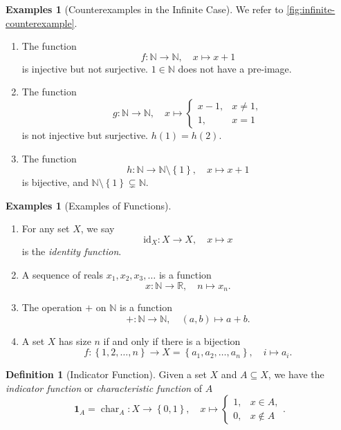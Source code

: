 \documentclass{article}
\theoremstyle{definition}
\newtheorem{definition}[theorem]{Definition}
\newtheorem{examples}[theorem]{Examples}
\theoremstyle{remark}
\newcommand{\pqty}[1]{\left(#1\right)}
\newcommand{\Bqty}[1]{\left\{#1\right\}}
\newcommand{\function}[5]{#1:#2\to #3,\quad #4\mapsto #5}
\newcommand{\identity}{\mathrm{id}}
\newcommand{\indicator}{\mathbf{1}}
\newcommand{\characteristic}{\operatorname{char}}
\newcommand{\NN}{\mathbb{N}}
\newcommand{\RR}{\mathbb{R}}
\begin{document}
\begin{examples}[Counterexamples in the Infinite Case]
    We refer to \autoref{fig:infinite-counterexample}.

    \begin{enumerate}
        \item The function
        \[
            \function{f}{\NN}{\NN}{x}{x + 1}
        \]
        is injective but not surjective. \(1 \in \NN\) does not have a pre-image.

        \item The function
        \[
            \function{g}{\NN}{\NN}{x}{\begin{cases}
            x - 1, & x \neq 1, \\ 1, & x = 1\end{cases}}
        \]
        is not injective but surjective. \(h\pqty{1} = h\pqty{2}\).

        \item The function
        \[
            \function{h}{\NN}{\NN \setminus \Bqty{1}}{x}{x + 1}
        \]
        is bijective, and \(\NN \setminus \Bqty{1} \subsetneq \NN\).
    \end{enumerate}
\end{examples}

\begin{examples}[Examples of Functions]
    \begin{enumerate}
        \item For any set \(X\), we say
        \[
            \function{\identity_X}{X}{X}{x}{x}
        \]
        is the \emph{identity function}.

        \item A sequence of reals \(x_1, x_2, x_3, \ldots\) is a function
        \[
            \function{x}{\NN}{\RR}{n}{x_n}.
        \]
        
        \item The operation \(+\) on \(\NN\) is a function
        \[
            \function{+}{\NN}{\NN}{\pqty{a, b}}{a + b}.
        \]

        \item A set \(X\) has size \(n\) if and only if there is a bijection
        \[
            \function{f}{\Bqty{1, 2, \ldots, n}}{X = \Bqty{a_1, a_2, \ldots, a_n}}{i}{a_i}.
        \]
    \end{enumerate}
\end{examples}

\begin{definition}[Indicator Function]
    Given a set \(X\) and \(A \subseteq X\), we have the \emph{indicator function} or \emph{characteristic function} of \(A\)
    \[
        \function{\indicator_A = \characteristic_A}{X}{\Bqty{0, 1}}{x}{\begin{cases}1, & x \in A, \\ 0, & x \notin A\end{cases}.}
    \]
\end{definition}
\end{document}
